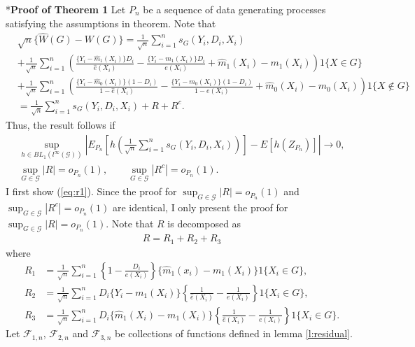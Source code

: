 \documentclass[12pt,oneside,reqno,english]{amsart}
\makeatletter
\renewcommand\subsection{\@startsection{subsection}{2}%
  \z@{-.5\linespacing\@plus-.7\linespacing}{.5\linespacing}%
  {\normalfont\scshape}}
\theoremstyle{definition}
\makeatother
\begin{document}
\subsection*{\bf{Proof of Theorem 1}}
Let $P_{n}$ be a sequence of data generating processes satisfying the assumptions in theorem. 
Note that 
\begin{align*}
&\sqrt{n}\{\hat{W}(G)-W(G)\}=\frac{1}{\sqrt{n}}\sum_{i=1}^{n}s_{G}(Y_{i},D_{i},X_{i})\\
&+\frac{1}{\sqrt{n}}\sum_{i=1}^{n}\left(\frac{\{Y_{i}-\hat{m}_{1}(X_{i})\}D_{i}}{\hat{e}(X_{i})}-\frac{\{Y_{i}-m_{1}(X_{i})\}D_{i}}{e(X_{i})}+\hat{m}_{1}(X_{i})
-m_{1}(X_{i})\right)1\{X\in G\}\\
&+
\frac{1}{\sqrt{n}}\sum_{i=1}^{n}\left(\frac{\{Y_{i}-\hat{m}_{0}(X_{i})\}(1-D_{i})}{1-\hat{e}(X_{i})}-\frac{\{Y_{i}-m_{0}(X_{i})\}(1-D_{i})}{1-e(X_{i})}+\hat{m}_{0}(X_{i})
-m_{0}(X_{i})\right)1\{X\not\in G\}\\
&=\frac{1}{\sqrt{n}}\sum_{i=1}^{n}s_{G}(Y_{i},D_{i},X_{i})+R+R^{c}.
\end{align*}
Thus, the result follows if 
\begin{align}
\sup_{h\in BL_{1}(l^{\infty}(\mathcal{G}))}\left|E_{P_{n}}\left[h\left(\frac{1}{\sqrt{n}}\sum_{i=1}^{n}s_{G}(Y_{i},D_{i},X_{i})\right)\right]-E[h(Z_{P_{n}})]\right|\rightarrow 0,\label{eq:asylin}\\
\sup_{G\in \mathcal{G}}|R|=o_{P_{n}}(1),\qquad \sup_{G\in \mathcal{G}}|R^{c}|=o_{P_{n}}(1).\label{eq:r1}
\end{align}
I first show (\ref{eq:r1}). 
Since the proof for $\sup_{G\in \mathcal{G}}|R|=o_{P_{n}}(1)$ and $\sup_{G\in \mathcal{G}}|R^{c}|=o_{P_{n}}(1)$
 are identical, I only present the proof for $\sup_{G\in \mathcal{G}}|R|=o_{P_{n}}(1)$. 
Note that $R$ is decomposed as 
\begin{align*}
R=R_{1}+R_{2}+R_{3}
\end{align*}
where 
\begin{align*}
R_{1}&= \frac{1}{\sqrt{n}}\sum_{i=1}^{n}\left\{1-\frac{D_{i}}{e(X_{i})}\right\}\{\hat{m}_{1}(x_{i})-m_{1}(X_{i})\}1\{X_{i}\in G\},\\
R_{2}&=\frac{1}{\sqrt{n}}\sum_{i=1}^{n}D_{i}\{Y_{i}-m_{1}(X_{i})\}\left\{\frac{1}{\hat{e}(X_{i})}-\frac{1}{e(X_{i})}\right\}1\{X_{i}\in G\},\\
R_{3}&=\frac{1}{\sqrt{n}}\sum_{i=1}^{n}D_{i}\{\hat{m}_{1}(X_{i})-m_{1}(X_{i})\}\left\{\frac{1}{\hat{e}(X_{i})}-\frac{1}{e(X_{i})}\right\}1\{X_{i}\in G\}.
\end{align*}
Let $\mathcal{F}_{1,n}$, $\mathcal{F}_{2,n}$ and $\mathcal{F}_{3,n}$ be collections of functions defined in lemma \ref{l:residual}. 
\end{document}
